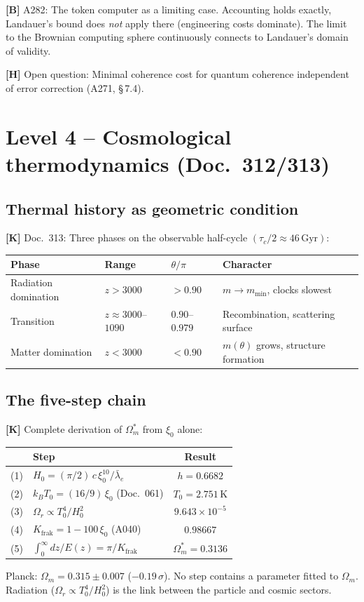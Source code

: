 \textbf{[B]} A282: The token computer as a limiting case. Accounting
holds exactly, Landauer's bound does \emph{not} apply there
(engineering costs dominate). The limit to the Brownian computing
sphere continuously connects to Landauer's domain of validity.

\textbf{[H]} Open question: Minimal coherence cost for quantum coherence
independent of error correction (A271, \S\,7.4).

\section{Level 4 -- Cosmological thermodynamics (Doc.~312/313)}

\subsection{Thermal history as geometric condition}

\textbf{[K]} Doc.~313: Three phases on the observable half-cycle
$(\tau_c/2 \approx 46\,\text{Gyr})$:

\begin{center}
	\small
	\begin{tabular}{llll}
		\toprule
		Phase & Range & $\theta/\pi$ & Character \\
		\midrule
		Radiation domination & $z > 3000$ & $> 0.90$ &
		$m \to m_\text{min}$, clocks slowest \\
		Transition & $z \approx 3000$--$1090$ & $0.90$--$0.979$ &
		Recombination, scattering surface \\
		Matter domination & $z < 3000$ & $< 0.90$ &
		$m(\theta)$ grows, structure formation \\
		\bottomrule
	\end{tabular}
\end{center}

\subsection{The five-step chain}

\textbf{[K]} Complete derivation of $\Omega_m^*$ from $\xi_0$ alone:
\begin{center}
	\small
	\begin{tabular}{clc}
		\toprule
		& Step & Result \\
		\midrule
		(1) & $H_0 = (\pi/2)\,c\,\xi_0^{10}/\bar\lambda_e$ & $h = 0.6682$ \\
		(2) & $k_BT_0 = (16/9)\,\xi_0$ (Doc.~061) & $T_0 = 2.751$\,K \\
		(3) & $\Omega_r \propto T_0^4/H_0^2$ & $9.643\times10^{-5}$ \\
		(4) & $K_\text{frak} = 1-100\,\xi_0$ (A040) & $0.98667$ \\
		(5) & $\int_0^\infty dz/E(z) = \pi/K_\text{frak}$ &
		$\boxed{\Omega_m^* = 0.3136}$ \\
		\bottomrule
	\end{tabular}
\end{center}
Planck: $\Omega_m = 0.315 \pm 0.007$ ($-0.19\,\sigma$).
No step contains a parameter fitted to $\Omega_m$.
Radiation ($\Omega_r \propto T_0^4/H_0^2$) is the link between
the particle and cosmic sectors.

